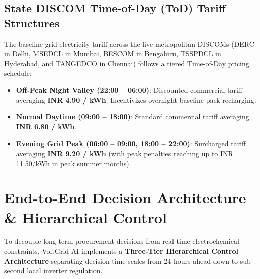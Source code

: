 \documentclass[10.5pt,a4paper]{article}
\begin{document}
\subsection{State DISCOM Time-of-Day (ToD) Tariff Structures}
The baseline grid electricity tariff across the five metropolitan DISCOMs (DERC in Delhi, MSEDCL in Mumbai, BESCOM in Bengaluru, TSSPDCL in Hyderabad, and TANGEDCO in Chennai) follows a tiered Time-of-Day pricing schedule:
\begin{itemize}[noitemsep]
    \item \textbf{Off-Peak Night Valley (22:00 -- 06:00)}: Discounted commercial tariff averaging \textbf{INR 4.90 / kWh}. Incentivizes overnight baseline pack recharging.
    \item \textbf{Normal Daytime (09:00 -- 18:00)}: Standard commercial tariff averaging \textbf{INR 6.80 / kWh}.
    \item \textbf{Evening Grid Peak (06:00 -- 09:00, 18:00 -- 22:00)}: Surcharged tariff averaging \textbf{INR 9.20 / kWh} (with peak penalties reaching up to INR 11.50/kWh in peak summer months).
\end{itemize}

\section{End-to-End Decision Architecture \& Hierarchical Control}

To decouple long-term procurement decisions from real-time electrochemical constraints, VoltGrid AI implements a \textbf{Three-Tier Hierarchical Control Architecture} separating decision time-scales from 24 hours ahead down to sub-second local inverter regulation.
\end{document}
